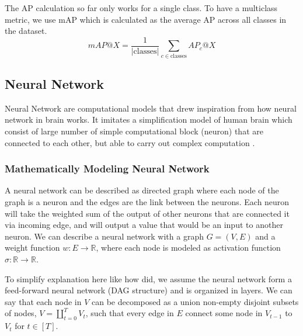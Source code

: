   The AP calculation so far only works for a single class. To have a multiclass metric, we use mAP
  which is calculated as the average AP across all classes in the dataset.
  \begin{equation}
    mAP@X = \frac{1}{|\text{classes}|} \sum_{c\in \text{classes}} AP_c@X
  \end{equation}

  \subsection{Neural Network}
  Neural Network are computational models that drew inspiration from how neural network in brain works.
  It imitates a simplification model of human brain which consist of large number of simple computational block (neuron)
  that are connected to each other, but able to carry out complex computation \parencite{mltheorytoalgo}. 

  \subsubsection{Mathematically Modeling Neural Network}
  A neural network can be described as directed graph where each node of the graph is a neuron and the edges are the link between the neurons.
  Each neuron will take the weighted sum of the output of other neurons that are connected it via incoming edge, and will output a value that would be an input to another neuron.
  We can describe a neural network with a graph $G = (V,E)$ and a weight function $w : E \rightarrow \mathbb{R}$, where each node is modeled as activation function $\sigma : \mathbb{R} \rightarrow \mathbb{R}$.

  To simplify explanation here like how \textcite{mltheorytoalgo} did, we assume the neural network form a feed-forward neural network (DAG structure) and is organized in layers.
  We can say that each node in $V$ can be decomposed as a union non-empty disjoint subsets of nodes, $V = \coprod_{t=0}^T V_t$, such that
  every edge in $E$ connect some node in $V_{t-1}$ to $V_t$ for $t\in [T]$.

